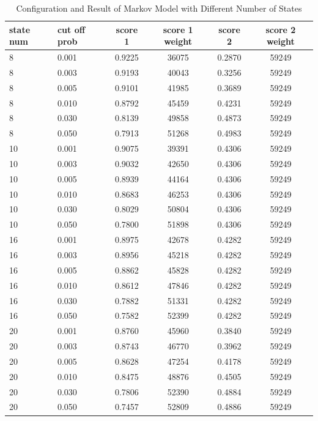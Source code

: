 \documentclass{article}
\begin{document}
\begin{longtable}[htbp]{l|l|*{4}{c}}
    \caption{Configuration and Result of Markov Model with Different Number of States}
    \label{tab:tab1.3.5}\\
    \textbf{state num} & \textbf{cut off prob} & \textbf{score 1} & \textbf{score 1 weight} & \textbf{score 2} & \textbf{score 2 weight} \\
    \hline
    8 & 0.001 & 0.9225 & 36075 & 0.2870 & 59249\\
    8 & 0.003 & 0.9193 & 40043 & 0.3256 & 59249\\
    8 & 0.005 & 0.9101 & 41985 & 0.3689 & 59249\\
    8 & 0.010 & 0.8792 & 45459 & 0.4231 & 59249\\
    8 & 0.030 & 0.8139 & 49858 & 0.4873 & 59249\\
    8 & 0.050 & 0.7913 & 51268 & 0.4983 & 59249\\
    10 & 0.001 & 0.9075 & 39391 & 0.4306 & 59249\\
    10 & 0.003 & 0.9032 & 42650 & 0.4306 & 59249\\
    10 & 0.005 & 0.8939 & 44164 & 0.4306 & 59249\\
    10 & 0.010 & 0.8683 & 46253 & 0.4306 & 59249\\
    10 & 0.030 & 0.8029 & 50804 & 0.4306 & 59249\\
    10 & 0.050 & 0.7800 & 51898 & 0.4306 & 59249\\
    16 & 0.001 & 0.8975 & 42678 & 0.4282 & 59249\\
    16 & 0.003 & 0.8956 & 45218 & 0.4282 & 59249\\
    16 & 0.005 & 0.8862 & 45828 & 0.4282 & 59249\\
    16 & 0.010 & 0.8612 & 47846 & 0.4282 & 59249\\
    16 & 0.030 & 0.7882 & 51331 & 0.4282 & 59249\\
    16 & 0.050 & 0.7582 & 52399 & 0.4282 & 59249\\
    20 & 0.001 & 0.8760 & 45960 & 0.3840 & 59249\\
    20 & 0.003 & 0.8743 & 46770 & 0.3962 & 59249\\
    20 & 0.005 & 0.8628 & 47254 & 0.4178 & 59249\\
    20 & 0.010 & 0.8475 & 48876 & 0.4505 & 59249\\
    20 & 0.030 & 0.7806 & 52390 & 0.4884 & 59249\\
    20 & 0.050 & 0.7457 & 52809 & 0.4886 & 59249\\
\end{longtable}
\end{document}
